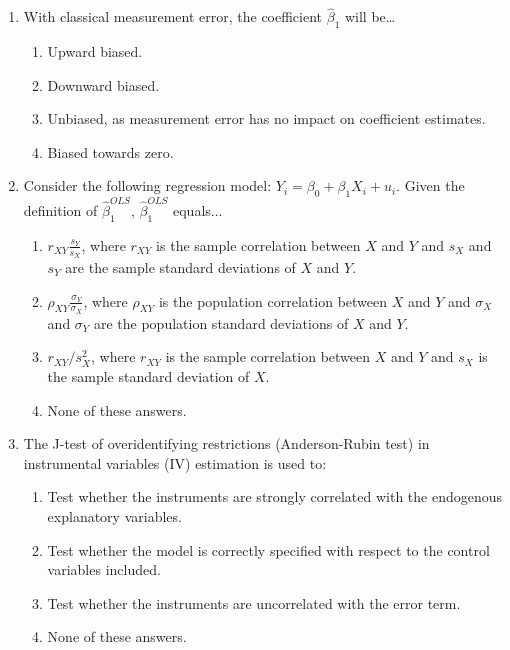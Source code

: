\documentclass{article}
\begin{document}
\begin{enumerate}
    \item With classical measurement error, the coefficient $\hat{\beta}_1$ will be…
    \begin{enumerate}[label=\alph*)]
        \item Upward biased.
        \item Downward biased.
        \item Unbiased, as measurement error has no impact on coefficient estimates.
        \item Biased towards zero. %
    \end{enumerate}\vspace{.25cm}


    \item Consider the following regression model: $Y_i = \beta_0 + \beta_1 X_i + u_i$. Given the definition of $\hat{\beta}^{OLS}_1$,  $\hat{\beta}^{OLS}_1$ equals...
    \begin{enumerate}[label=\alph*)]
        \item $r_{XY}\frac{s_Y}{s_X}$, where $r_{XY}$ is the sample correlation between $X$ and $Y$ and ${s_X}$ and ${s_Y}$ are the sample standard deviations of $X$ and $Y$. 
        \item $\rho_{XY}\frac{\sigma_Y}{\sigma_X}$, where $\rho_{XY}$ is the population correlation between $X$ and $Y$ and ${\sigma_X}$ and ${\sigma_Y}$ are the population standard deviations of $X$ and $Y$. 
        \item $r_{XY}/{s_X^2}$, where $r_{XY}$ is the sample correlation between $X$ and $Y$ and ${s_X}$ is the sample standard deviation of $X$. 
        \item None of these answers. 
    \end{enumerate}\vspace{.25cm}


    \item The J-test of overidentifying restrictions (Anderson-Rubin test)  in instrumental variables (IV) estimation is used to:
    \begin{enumerate}[label=\alph*)]
        \item Test whether the instruments are strongly correlated with the endogenous explanatory variables.
        \item Test whether the model is correctly specified with respect to the control variables included.
        \item Test whether the instruments are uncorrelated with the error term.
        \item None of these answers.
    \end{enumerate}\vspace{.25cm}



\end{enumerate}
\end{document}
